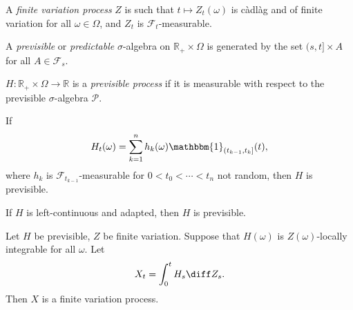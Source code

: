 \documentclass[12pt]{article}
\begin{document}
\begin{definition}
	A \emph{finite variation process} $Z$ is such that $t \mapsto Z_t(\omega)$ is c\`adl\`ag and of finite variation for all $\omega \in \Omega$, and $Z_t$ is $\mathcal{F}_t$-measurable.
\end{definition}

\begin{definition}
	A \emph{previsible} or \emph{predictable} $\sigma$-algebra on $\mathbb{R}_+ \times \Omega$ is generated by the set $(s, t] \times A$ for all $A \in \mathcal{F}_s$.

	$H : \mathbb{R}_+ \times \Omega \to \mathbb{R}$ is a \emph{previsible process} if it is measurable with respect to the previsible $\sigma$-algebra $\mathcal{P}$.
\end{definition}

\begin{remark}
	If 
	\[
		H_t(\omega) = \sum_{k = 1}^{n} h_k(\omega) \mathbbm{1}_{(t_{k-1}, t_k]}(t),
	\]
	where $h_k$ is $\mathcal{F}_{t_{k-1}}$-measurable for $0 < t_0 < \cdots < t_n$ not random, then $H$ is previsible.
\end{remark}

If $H$ is left-continuous and adapted, then $H$ is previsible.

\begin{theorem}
	Let $H$ be previsible, $Z$ be finite variation. Suppose that $H(\omega)$ is $Z(\omega)$-locally integrable for all $\omega$. Let
	\[
	X_t = \int_0^t H_s \diff Z_s.
	\]
	Then $X$ is a finite variation process.
\end{theorem}
\end{document}
